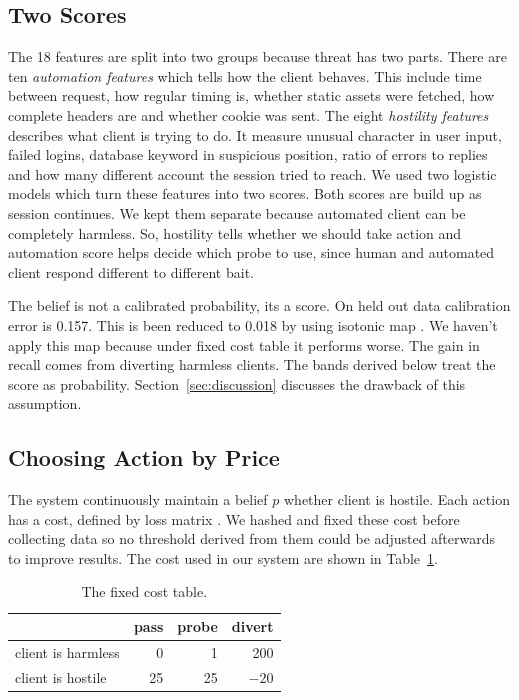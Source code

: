 \documentclass[runningheads]{llncs}
\begin{document}
\subsection{Two Scores}
The 18 features are split into two groups because threat has two parts. There are ten \emph{automation features} which tells how the client behaves. This include time between request, how regular timing is, whether static assets were fetched, how complete headers are and whether cookie was sent. The eight \emph{hostility features} describes what client is trying to do. It measure unusual character in user input, failed logins, database keyword in suspicious position, ratio of errors to replies and how many different account the session tried to reach. We used two logistic models which turn these features into two scores. Both scores are build up as session continues. We kept them separate because automated client can be completely harmless. So, hostility tells whether we should take action and automation score helps decide which probe to use, since human and automated client respond different to different bait.

The belief is not a calibrated probability, its a score. On held out data calibration error is 0.157. This is been reduced to 0.018 by using isotonic map \cite{zadrozny2002transforming}. We haven't apply this map because under fixed cost table it performs worse. The gain in recall comes from diverting harmless clients. The bands derived below treat the score as probability. Section~\ref{sec:discussion} discusses the drawback of this assumption.

\subsection{Choosing Action by Price}

The system continuously maintain a belief $p$ whether client is hostile. Each action has a cost, defined by loss matrix \cite{elkan2001foundations}. We hashed and fixed these cost before collecting data so no threshold derived from them could be adjusted afterwards to improve results. The cost used in our system are shown in Table~\ref{tab:costs}.

\begin{table}[t]
\centering
\caption{The fixed cost table.}
\label{tab:costs}
\begin{tabular}{@{}lrrr@{}}
\toprule
 & pass & probe & divert \\
\midrule
client is harmless & 0  & 1  & 200 \\
client is hostile  & 25 & 25 & $-20$ \\
\bottomrule
\end{tabular}
\end{table}
\end{document}
